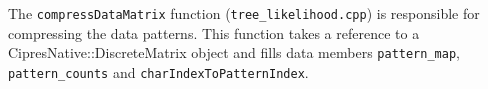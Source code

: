 \documentclass[12pt]{article}
\newcommand{\cppfile}[1]{{\tt #1}}
\newcommand{\function}[1]{{\tt #1}}
\newcommand{\datamember}[1]{{\tt #1}}
\begin{document}
The \function{compressDataMatrix} function (\cppfile{tree\_likelihood.cpp}) is responsible for compressing the data patterns. This function takes a reference to a CipresNative::DiscreteMatrix object and fills data members \datamember{pattern\_map}, \datamember{pattern\_counts} and \datamember{charIndexToPatternIndex}.

%
%

%
\end{document}
